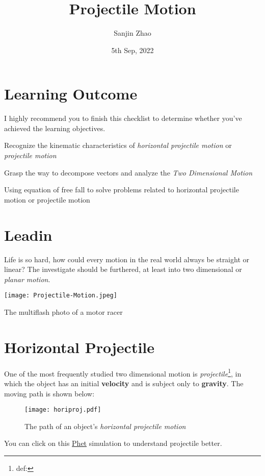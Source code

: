 \documentclass[a4paper]{tufte-handout}
\title{Projectile Motion}
\author{Sanjin Zhao}
\date{5th Sep, 2022}  %
\begin{document}
\maketitle%
\section*{Learning Outcome}
I highly recommend you to finish this checklist to determine whether you've achieved the learning objectives.
\begin{todolist}
  \item Recognize the kinematic characteristics of \emph{horizontal projectile motion} or \emph{projectile motion} 
  \item Grasp the way to decompose vectors and analyze the \emph{Two Dimensional Motion}
  \item Using equation of free fall to solve problems related to horizontal projectile motion or projectile motion
\end{todolist}
\clearpage

\section{Leadin}
Life is so hard, how could every motion in the real world always be straight or linear? The investigate should be furthered, at least into two dimensional or \emph{planar motion}.
\begin{marginfigure}
\texttt{[image: Projectile-Motion.jpeg]}
\caption{The multiflash photo of a motor racer}
\label{fig:motorcycle}
\end{marginfigure}

\section{Horizontal Projectile}
One of the most frequently studied two dimensional motion is \emph{projectile}\footnote{def:}, in which the object has an initial \textbf{velocity} and is subject only to \textbf{gravity}. The moving path is shown below:
\begin{figure}[h]
\texttt{[image: horiproj.pdf]}
\caption{The path of an object's \emph{horizontal projectile motion}}
\label{fig:parabola}
\end{figure}

You can click on this \href{https://phet.colorado.edu/sims/html/projectile-motion/latest/projectile-motion_en.html}{Phet} simulation to understand projectile better. 
\end{document}
